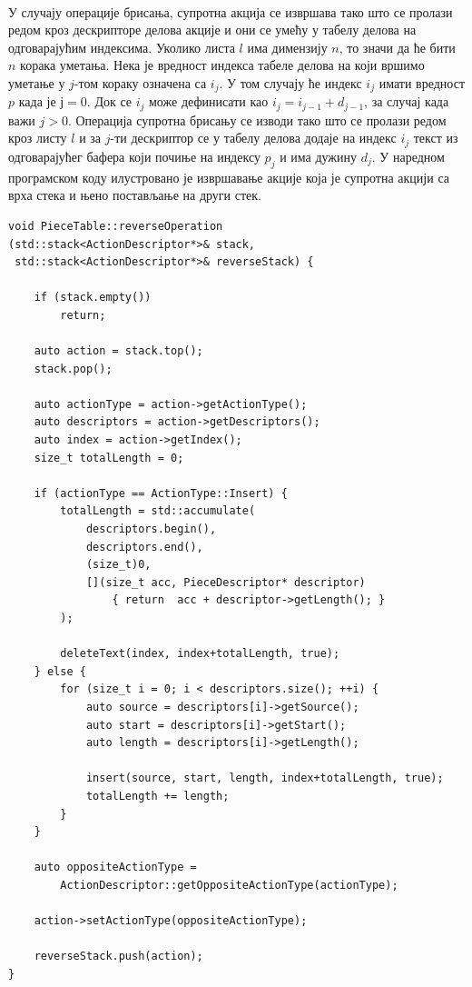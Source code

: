 \documentclass[12pt,oneside]{memoir}
\begin{document}
\paragraph{}
У случају операције брисања, супротна акција се извршава тако што се
пролази редом кроз дескрипторе делова акције и они се умећу у табелу
делова на одговарајућим индексима. Уколико листа \(l\) има димензију \(n\), то значи да ће бити
\(n\) корака уметања. Нека је вредност индекса табеле делова на који
вршимо уметање у \(j\)-том кораку означена са \(i_j\).
У том случају ће индекс \(i_j\) имати вредност \(p\) када је \(ј = 0\). Док се \(i_j\) може дефинисати као \(i_j = i_{j-1} + d_{j-1}\),
за случај када важи \(j > 0\). Операција супротна брисању се изводи тако што се пролази редом кроз листу \(l\) и за \(j\)-ти дескриптор се у табелу делова додаје на индекс \(i_j\) текст из одговарајућег бафера који почиње на индексу \(p_j\) и има дужину \(d_j\). У наредном програмском коду илустровано је
извршавање акције која је супротна акцији са врха стека и њено постављање на
други стек.

\begin{verbatim}
void PieceTable::reverseOperation
(std::stack<ActionDescriptor*>& stack, 
 std::stack<ActionDescriptor*>& reverseStack) {
	
	if (stack.empty())
		return;
	
	auto action = stack.top();
	stack.pop();
	
	auto actionType = action->getActionType();
	auto descriptors = action->getDescriptors();
	auto index = action->getIndex();
	size_t totalLength = 0;
	
	if (actionType == ActionType::Insert) {
		totalLength = std::accumulate(
			descriptors.begin(), 
			descriptors.end(), 
			(size_t)0,
			[](size_t acc, PieceDescriptor* descriptor) 
				{ return  acc + descriptor->getLength(); }
		);
		
		deleteText(index, index+totalLength, true);
	} else {
		for (size_t i = 0; i < descriptors.size(); ++i) {
			auto source = descriptors[i]->getSource();
			auto start = descriptors[i]->getStart();
			auto length = descriptors[i]->getLength();
			
			insert(source, start, length, index+totalLength, true);
			totalLength += length;
		}
	}
	
	auto oppositeActionType = 
		ActionDescriptor::getOppositeActionType(actionType);
		
	action->setActionType(oppositeActionType);
	
	reverseStack.push(action);
}
\end{verbatim}
\end{document}

